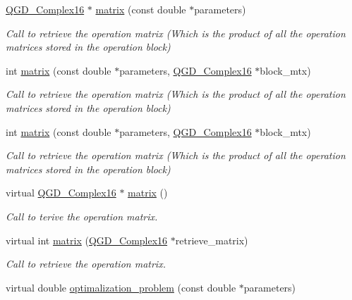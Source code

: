 \begin{DoxyCompactItemize}
\hyperlink{struct_q_g_d___complex16}{Q\+G\+D\+\_\+\+Complex16} $\ast$ \hyperlink{class_operation__block_a43cdb87a4ee2a339de30c94cc94fa40e}{matrix} (const double $\ast$parameters)
\begin{DoxyCompactList}\small\item\em Call to retrieve the operation matrix (Which is the product of all the operation matrices stored in the operation block) \end{DoxyCompactList}\item 
int \hyperlink{class_operation__block_abf4287a38eeca35a81163f86a361d95c}{matrix} (const double $\ast$parameters, \hyperlink{struct_q_g_d___complex16}{Q\+G\+D\+\_\+\+Complex16} $\ast$block\+\_\+mtx)
\begin{DoxyCompactList}\small\item\em Call to retrieve the operation matrix (Which is the product of all the operation matrices stored in the operation block) \end{DoxyCompactList}\item 
int \hyperlink{class_operation__block_abf4287a38eeca35a81163f86a361d95c}{matrix} (const double $\ast$parameters, \hyperlink{struct_q_g_d___complex16}{Q\+G\+D\+\_\+\+Complex16} $\ast$block\+\_\+mtx)
\begin{DoxyCompactList}\small\item\em Call to retrieve the operation matrix (Which is the product of all the operation matrices stored in the operation block) \end{DoxyCompactList}\item 
virtual \hyperlink{struct_q_g_d___complex16}{Q\+G\+D\+\_\+\+Complex16} $\ast$ \hyperlink{class_operation_acf7d1765143285ff73772ae860109988}{matrix} ()
\begin{DoxyCompactList}\small\item\em Call to terive the operation matrix. \end{DoxyCompactList}\item 
virtual int \hyperlink{class_operation_add11c6ea2626d8dbcbd00f328a8a8279}{matrix} (\hyperlink{struct_q_g_d___complex16}{Q\+G\+D\+\_\+\+Complex16} $\ast$retrieve\+\_\+matrix)
\begin{DoxyCompactList}\small\item\em Call to retrieve the operation matrix. \end{DoxyCompactList}\item 
virtual double \hyperlink{class_decomposition___base_abc06e307be293edcd0cecae99dfbed04}{optimalization\+\_\+problem} (const double $\ast$parameters)

\end{DoxyCompactItemize}
